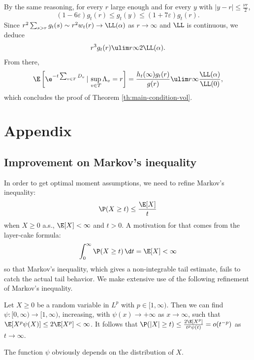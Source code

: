 \documentclass[10pt,a4paper]{article}
\begin{document}
By the same reasoning, for every $r$ large enough and
for every $y$ with $|y-r|\leq \frac{\nu r}{2}$, 
\[ (1-6\varepsilon) g_t(r) \leq g_t(y) \leq (1+7\varepsilon) g_t(r) . \]
Since $r^2 \sum_{s>r} g_t(s) \sim r^2 w_t(r) \to \LL(\alpha)$ as $r\to\infty$ and $\LL$ is continuous, we deduce
\[ r^3 g_t(r) \ulim r \infty 2 \LL(\alpha) . \]
From there,
\[ \E\left[ \e^{-t\sum_{v\in T} D_v} \, | \, \sup_{v\in T} \Lambda_v = r\right] = \frac{h_t(\infty) g_t(r)}{g(r)} \ulim r \infty \frac{\LL(\alpha)}{\LL(0)} , \]
which concludes the proof of Theorem \ref{th:main-condition-vol}. 






















\section{Appendix}

\subsection{Improvement on Markov's inequality}

In order to get optimal moment assumptions, we need to refine Markov's inequality:
\[ \P(X\geq t) \leq \frac{\E[X]}{t} \]
when $X\geq 0$ a.s., $\E[X]<\infty$ and $t>0$. A motivation for that comes from the layer-cake formula: 
\[ \int_0^\infty \P(X\geq t) \, \d t = \E[X] <\infty \]
so that Markov's inequality, which gives a non-integrable tail estimate, fails to catch the actual tail behavior. We make extensive use of the following refinement of Markov's inequality. 
\begin{lemma}\label{lem:refined-Markov}
Let $X\geq 0$ be a random variable in $L^p$ with $p\in [1,\infty)$. Then we can find $\psi: [0,\infty) \to [1,\infty)$, increasing, with $\psi(x) \to +\infty$ as $x\to\infty$, such that $\E[X^p \psi(X)]\leq 2 \E[X^p] < \infty$. It follows that $\P(|X|\geq t) \leq \frac{2\E[X^p]}{t^p\psi(t)} = o(t^{-p})$ as $t\to\infty$. 
\end{lemma}

The function $\psi$ obviously depends on the distribution of $X$. %
\end{document}
